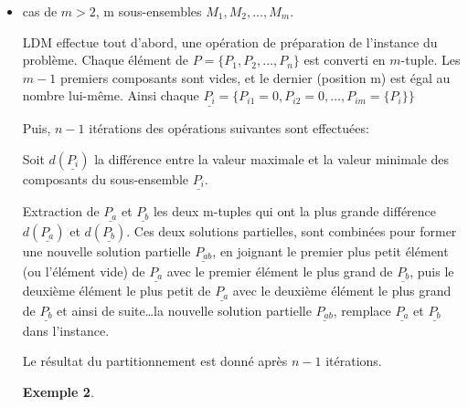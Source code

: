 \documentclass[a4paper,12pt]{report}
\theoremstyle{plain}				%
\newtheorem{example}{Exemple}
\theoremstyle{definition}				%
\begin{document}
\begin{itemize}
\begin{example}
\end{example}

\bigskip

\item cas de $m>2$, m sous-ensembles $M_1,M_2, \ldots, M_m $.

%
%
LDM effectue tout d'abord, une opération de préparation de l'instance du problème. Chaque élément de $P = \{ P_1, P_2, \ldots, P_n \}$ est converti en $m$-tuple. Les $m-1$ premiers composants sont vides, et le dernier (position m) est égal au nombre lui-même. Ainsi chaque $\underline{P_i} = \{P_{i 1}=0,P_{i 2}=0, \ldots, P_{i m}=\{P_i\} \}$

Puis, $n-1$ itérations des opérations suivantes sont effectuées:


Soit $d(\underline{P_i})$ la différence entre la valeur maximale et la valeur minimale des composants du sous-ensemble $\underline{P_i}$.

Extraction de $\underline{P_a}$ et $\underline{P_b}$ les deux m-tuples qui ont la plus grande différence $d(\underline{P_a})$ et $d(\underline{P_b})$. Ces deux solutions partielles, sont combinées pour former une nouvelle solution partielle $\underline{P_{ab}}$, en joignant le premier plus petit élément (ou l'élément vide) de $\underline{P_a}$ avec le premier élément le plus grand de $\underline{P_b}$, puis le deuxième élément le plus petit de $\underline{P_a}$ avec le deuxième élément le plus grand de $\underline{P_b}$ et ainsi de suite\ldots la nouvelle solution partielle $\underline{P_{ab}}$, remplace $\underline{P_a}$ et $\underline{P_b}$ dans l'instance.

Le résultat du partitionnement est donné après $n-1$ itérations.

\begin{example}


\end{example}
\end{itemize}
\end{document}
